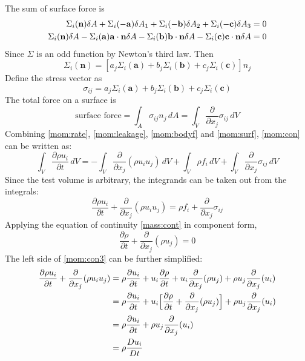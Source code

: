 \newslide
The sum of surface force is
\begin{align}
    \Sigma_i(\mathbf{n})\delta A + \Sigma_i(-\mathbf{a})\delta A_1 + \Sigma_i(-\mathbf{b})\delta
    A_2 + \Sigma_i(-\mathbf{c})\delta A_3 = 0\notag\\
    \Sigma_i(\mathbf{n})\delta A - \Sigma_i(\mathbf{a})\mathbf{a}\cdot \mathbf{n}\delta A
     - \Sigma_i(\mathbf{b})\mathbf{b}\cdot \mathbf{n}\delta
    A - \Sigma_i(\mathbf{c})\mathbf{c}\cdot \mathbf{n}\delta A = 0
\end{align}
Since $\Sigma$ is an odd function by Newton's third law. Then
\begin{equation}\label{mom:surf1}
    \Sigma_i(\mathbf{n}) = [ a_j\Sigma_i(\mathbf{a}) + b_j\Sigma_i(\mathbf{b}) +
    c_j\Sigma_i(\mathbf{c})] n_j
\end{equation}
Define the stress vector as
\begin{equation}\label{mom:surf1}
    \sigma_{ij} = a_j\Sigma_i(\mathbf{a}) + b_j\Sigma_i(\mathbf{b}) +
    c_j\Sigma_i(\mathbf{c})
\end{equation}
The total force on a surface is
\begin{equation}\label{mom:surf}
    \text{surface force} = \int_A\sigma_{ij}n_j\,dA = \int_V\frac{\partial}{\partial x_j}\sigma_{ij}\,dV
\end{equation}
\newslide
Combining \eqref{mom:rate}, \eqref{mom:leakage}, \eqref{mom:bodyf}
and \eqref{mom:surf}, \eqref{mom:con} can be written as:
\begin{equation}\label{mom:con2}
    \int_V\frac{\partial\rho u_i}{\partial t}\,dV = - \int_V\frac{\partial}{\partial x_j}(\rho u_i
    u_j)\,dV + \int_V\rho f_i\,dV + \int_V\frac{\partial}{\partial x_j}\sigma_{ij}\,dV
\end{equation}
Since the test volume is arbitrary, the integrands can be taken out
from the integrals:
\begin{equation}\label{mom:con3}
    \frac{\partial\rho u_i}{\partial t} + \frac{\partial}{\partial x_j}(\rho u_i
    u_j) = \rho f_i + \frac{\partial}{\partial x_j}\sigma_{ij}
\end{equation}
Applying the equation of continuity \eqref{mass:cont} in component
form,
\begin{equation*}
\frac{\partial\rho}{\partial t}+\frac{\partial}{\partial x_j}(\rho
u_j) = 0
\end{equation*}
\newslide
The left side of \eqref{mom:con3} can be further simplified:
\begin{align*}
    \frac{\partial\rho u_i}{\partial t} + \frac{\partial}{\partial x_j}(\rho u_i
    u_j) &= \rho\frac{\partial u_i}{\partial t} + u_i\frac{\partial\rho}{\partial t} +
    u_i\frac{\partial}{\partial x_j}(\rho u_j) + \rho u_j\frac{\partial}{\partial
    x_j}(u_i)\\
    &= \rho\frac{\partial u_i}{\partial t} + u_i\Bigl[\frac{\partial\rho}{\partial t} +
    \frac{\partial}{\partial x_j}(\rho u_j)\Bigr] + \rho u_j\frac{\partial}{\partial
    x_j}(u_i)\\
    &= \rho\frac{\partial u_i}{\partial t} + \rho u_j\frac{\partial}{\partial
    x_j}(u_i)\\
    &= \rho\frac{D u_i}{D t}
\end{align*}
